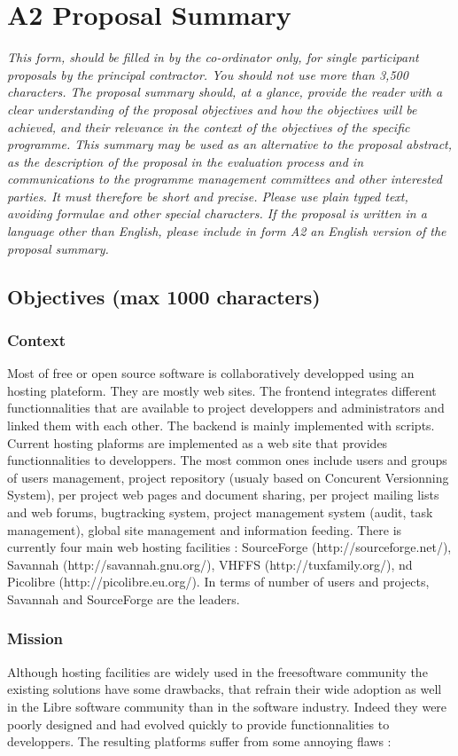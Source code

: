 \documentclass[a4paper,11pt]{report}
\begin{document}
\section*{A2 Proposal Summary}
\textit{This form, should be filled in by the co-ordinator only, for single
participant proposals by the principal contractor. You should not use more than
3,500 characters. The proposal summary should, at a glance, provide the reader
with a clear understanding of the proposal objectives and how the objectives
will be achieved, and their relevance in the context of the objectives of the
specific programme. This summary may be used as an alternative to the proposal
abstract, as the description of the proposal in the evaluation process and in
communications to the programme management committees and other interested
parties. It must therefore be short and precise. Please use plain typed text,
avoiding formulae and other special characters. If the proposal is written in a
language other than English, please include in form A2 an English version of
the proposal summary.} \\
\subsection*{Objectives (max 1000 characters)}
\subsubsection{Context}
Most of free or open source software is collaboratively developped using an
hosting plateform. They are mostly web sites. The frontend integrates different
functionnalities that are available to project developpers and administrators
and linked them with each other. The backend is mainly implemented with
scripts. \\
Current hosting plaforms are implemented as a  web site that provides
functionnalities to developpers. The most common ones include  users and groups
of users management, project repository (usualy based on Concurent Versionning
System), per project web pages and document sharing, per project mailing lists
and web forums, bugtracking system, project management system (audit, task
management), global site management and information feeding. There is currently
four main web hosting facilities : SourceForge (http://sourceforge.net/),
Savannah (http://savannah.gnu.org/), VHFFS (http://tuxfamily.org/), nd
Picolibre (http://picolibre.eu.org/). In terms of number of users and projects,
Savannah and SourceForge are the leaders.
\subsubsection{Mission}
Although hosting facilities are widely used in the freesoftware community the
existing solutions have some drawbacks, that refrain their wide adoption as
well in the Libre software community than in the software industry. Indeed
they were poorly designed and had evolved quickly to provide functionnalities
to developpers. The resulting platforms suffer from some annoying flaws :
\end{document}
